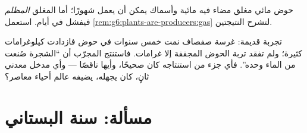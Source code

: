 \begin{exercise}[$\star\star$]\label{exo:g6:plants-are-producers:11}
حوض مائي مغلق مضاء فيه  مائية وأسماك يمكن أن يعمل شهورًا؛
أما المغلق \emph{المظلم} فيفشل في أيام. استعمل
\cref{rem:g6:plants-are-producers:gas} لتشرح النتيجتين.
\end{exercise}

\begin{exercise}[$\star\star\star$]\label{exo:g6:plants-are-producers:12}
تجربة قديمة: غرسة صفصاف نمت خمس سنوات في حوض فازدادت كيلوغرامات
كثيرة؛ ولم تفقد تربة الحوض المجففة إلا غرامات. فاستنتج المجرّب أن
``الشجرة صُنعت من الماء وحده''. فأي جزء من استنتاجه كان صحيحًا،
وأيها ناقصًا --- وأي مدخل معدني ثانٍ، كان يجهله، يضيفه عالم أحياء
معاصر؟
\end{exercise}

\section{مسألة: سنة البستاني}

